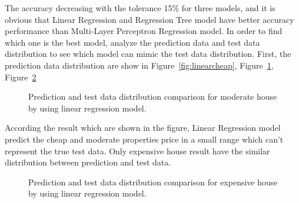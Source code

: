 \documentclass[11pt,a4paper]{article}
\begin{document}
The accuracy decreasing with the tolerance 15\% for three models, and it is obvious that Linear Regression and Regression Tree model have better accuracy performance than Multi-Layer Perceptron Regression model. In order to find which one is the best model, analyze the prediction data and test data distribution to see which model can mimic the test data distribution. First, the prediction data distribution are show in Figure~\ref{fig:linearcheap}, Figure~\ref{fig:linearmoderate}, Figure~\ref{fig:linearexpensive}

\begin{figure}[h]
    \centering
    \hfill%
    \caption{Prediction and test data distribution comparison for moderate house by using linear regression model.}
    \label{fig:linearmoderate}
\end{figure}

According the result which are shown in the figure, Linear Regression model predict the cheap and moderate properties price in a small range which can't represent the true test data. Only expensive house result have the similar distribution between prediction and test data.

\begin{figure}[h]
    \centering
    \hfill%
    \caption{Prediction and test data distribution comparison for expensive house by using linear regression model.}
    \label{fig:linearexpensive}
\end{figure}
\end{document}
